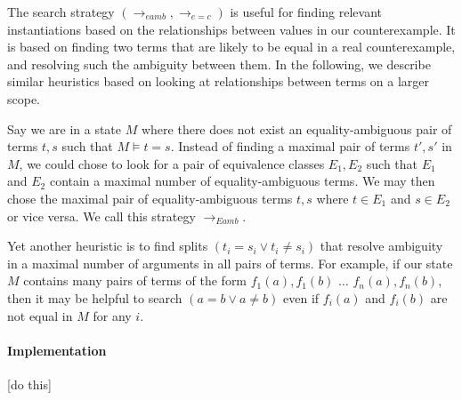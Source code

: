 \documentclass{llncs}
\begin{document}
The search strategy $( \rightarrow_{eamb}, \rightarrow_{e=c} )$ is useful for finding relevant instantiations based on the relationships between values in our counterexample.
It is based on finding two terms that are likely to be equal in a real counterexample, and resolving such the ambiguity between them.
In the following, we describe similar heuristics based on looking at relationships between terms on a larger scope.

Say we are in a state $M$ where there does not exist an equality-ambiguous pair of terms $t,s$ such that $M \models t = s$.
Instead of finding a maximal pair of terms $t',s'$ in $M$, we could chose to look for a pair of equivalence classes $E_1, E_2$ such that $E_1$ and $E_2$ contain a maximal number of equality-ambiguous terms.
We may then chose the maximal pair of equality-ambiguous terms $t,s$ where $t \in E_1$ and $s \in E_2$ or vice versa.
We call this strategy $\rightarrow_{Eamb}$.

Yet another heuristic is to find splits $( t_i = s_i \vee t_i \neq s_i )$ that resolve ambiguity in a maximal number of arguments in all pairs of terms.
For example, if our state $M$ contains many pairs of terms of the form $f_1( a ), f_1( b )$ $\ldots$ $f_n( a ), f_n( b )$, then it may be helpful to search $( a = b \vee a \neq b )$ even if $f_i( a )$ and $f_i( b )$ are not equal in $M$ for any $i$.

\paragraph{Implementation}



[do this] \\
\end{document}
